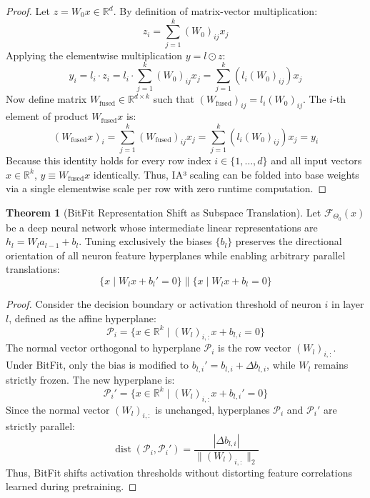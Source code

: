 \documentclass[11pt,a4paper]{article}
\theoremstyle{definition}
\newtheorem{theorem}{\textbf{Theorem}}[section]
\begin{document}
\begin{proof}
Let $z = W_0 x \in \mathbb{R}^d$. By definition of matrix-vector multiplication:
{\boldmath
\begin{equation}
z_i = \sum_{j=1}^k (W_0)_{ij} x_j
\end{equation}
}
Applying the elementwise multiplication $y = l \odot z$:
{\boldmath
\begin{equation}
y_i = l_i \cdot z_i = l_i \cdot \sum_{j=1}^k (W_0)_{ij} x_j = \sum_{j=1}^k (l_i (W_0)_{ij}) x_j
\end{equation}
}
Now define matrix $W_{\text{fused}} \in \mathbb{R}^{d \times k}$ such that $(W_{\text{fused}})_{ij} = l_i (W_0)_{ij}$.
The $i$-th element of product $W_{\text{fused}} x$ is:
{\boldmath
\begin{equation}
(W_{\text{fused}} x)_i = \sum_{j=1}^k (W_{\text{fused}})_{ij} x_j = \sum_{j=1}^k (l_i (W_0)_{ij}) x_j = y_i
\end{equation}
}
Because this identity holds for every row index $i \in \{1, \dots, d\}$ and all input vectors $x \in \mathbb{R}^k$, $y \equiv W_{\text{fused}} x$ identically. Thus, IA³ scaling can be folded into base weights via a single elementwise scale per row with zero runtime computation.
\end{proof}

\begin{theorem}[BitFit Representation Shift as Subspace Translation]
Let $\mathcal{F}_{\Theta_0}(x)$ be a deep neural network whose intermediate linear representations are $h_l = W_l a_{l-1} + b_l$. Tuning exclusively the biases $\{b_l\}$ preserves the directional orientation of all neuron feature hyperplanes while enabling arbitrary parallel translations:
{\boldmath
\begin{equation}
\{ x \mid W_l x + b_l' = 0 \} \parallel \{ x \mid W_l x + b_l = 0 \}
\end{equation}
}
\end{theorem}

\begin{proof}
Consider the decision boundary or activation threshold of neuron $i$ in layer $l$, defined as the affine hyperplane:
{\boldmath
\begin{equation}
\mathcal{P}_i = \{ x \in \mathbb{R}^k \mid (W_l)_{i,:} x + b_{l, i} = 0 \}
\end{equation}
}
The normal vector orthogonal to hyperplane $\mathcal{P}_i$ is the row vector $(W_l)_{i,:}$.
Under BitFit, only the bias is modified to $b_{l, i}' = b_{l, i} + \Delta b_{l, i}$, while $W_l$ remains strictly frozen.
The new hyperplane is:
{\boldmath
\begin{equation}
\mathcal{P}_i' = \{ x \in \mathbb{R}^k \mid (W_l)_{i,:} x + b_{l, i}' = 0 \}
\end{equation}
}
Since the normal vector $(W_l)_{i,:}$ is unchanged, hyperplanes $\mathcal{P}_i$ and $\mathcal{P}_i'$ are strictly parallel:
{\boldmath
\begin{equation}
\operatorname{dist}(\mathcal{P}_i, \mathcal{P}_i') = \frac{|\Delta b_{l, i}|}{\|(W_l)_{i,:}\|_2}
\end{equation}
}
Thus, BitFit shifts activation thresholds without distorting feature correlations learned during pretraining.
\end{proof}
\end{document}
